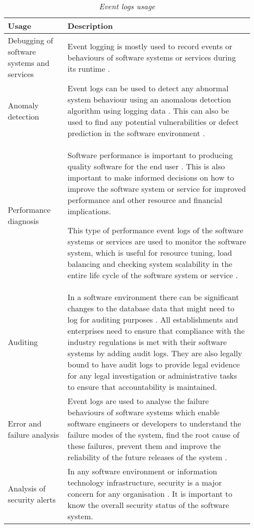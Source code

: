 \begin{table}[!htb]
	\centering
	\caption[Event logs usage]
	{\textit{Event logs usage}}
	\label{tbl:ch1_eventLogsUsage}
	\begin{tabularx}{\textwidth}{|l|X|}
		\hline \textbf{Usage} & \textbf{Description} \\
		\hline Debugging of software systems and services & Event logging is mostly used to record events or behaviours of software systems or services during its runtime \cite{Rong2018a}.\\
		\hline Anomaly detection & Event logs can be used to detect any abnormal system behaviour using an anomalous detection algorithm using logging data \cite{Gurumdimma2016}. This can also be used to find any potential vulnerabilities or defect prediction in the software environment \cite{Dwyer2013}. \\
		\hline Performance diagnosis & Software performance is important to producing quality software for the end user \cite{EvangelinGeetha2007, Baccanico2014}. This is also important to make informed decisions on how to improve the software system or service for improved performance and other resource and financial implications.\par This type of performance event logs of the software systems or services are used to monitor the software system, which is useful for resource tuning, load balancing and checking system scalability in the entire life cycle of the software system or service \cite{Song2017}. \\ 
		\hline Auditing & In a software environment there can be significant changes to the database data that might need to log for auditing purposes \cite{Rong2018a}. All establishments and enterprises need to ensure that compliance with the industry regulations is met with their software systems by adding audit logs. They are also legally bound to have audit logs to provide legal evidence for any legal investigation or administrative tasks to ensure that accountability is maintained. \\
		\hline Error and failure analysis & Event logs are used to analyse the failure behaviours of software systems which enable software engineers or developers to understand the failure modes of the system, find the root cause of these failures, prevent them and improve the reliability of the future releases of the system \cite{Cinque2013}.\\
		\hline Analysis of security alerts & In any software environment or information technology infrastructure, security is a major concern for any organisation \cite{Pathan2014, Dwyer2013}. It is important to know the overall security status of the software system. \\
		\hline
	\end{tabularx}
\end{table}

